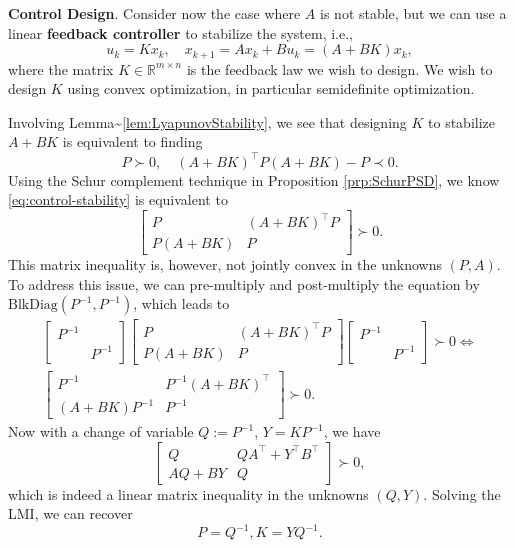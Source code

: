 \documentclass[
]{book}
\theoremstyle{definition}
\theoremstyle{definition}
\theoremstyle{definition}
\theoremstyle{definition}
\theoremstyle{remark}
\begin{document}
\textbf{Control Design}. Consider now the case where \(A\) is not stable, but we can use a linear \textbf{feedback controller} to stabilize the system, i.e.,
\[
u_k = K x_k, \quad x_{k+1} = A x_k + B u_k = (A+ BK) x_k,
\]
where the matrix \(K \in \mathbb{R}^{m \times n}\) is the feedback law we wish to design. We wish to design \(K\) using convex optimization, in particular semidefinite optimization.

Involving Lemma\textasciitilde\ref{lem:LyapunovStability}, we see that designing \(K\) to stabilize \(A + BK\) is equivalent to finding
\begin{equation}
P \succ 0, \quad (A + BK)^\top P (A + BK) - P \prec 0.
\label{eq:control-stability}
\end{equation}
Using the Schur complement technique in Proposition \ref{prp:SchurPSD}, we know \eqref{eq:control-stability} is equivalent to
\[
\begin{bmatrix}
P & (A + BK)^\top P \\
P(A+BK) & P \end{bmatrix} \succ 0.
\]
This matrix inequality is, however, not jointly convex in the unknowns \((P,A)\). To address this issue, we can pre-multiply and post-multiply the equation by \(\mathrm{BlkDiag}(P^{-1}, P^{-1})\), which leads to
\begin{equation}
\begin{split}
\begin{bmatrix} P^{-1}& \\
& P^{-1}\end{bmatrix}
\begin{bmatrix}
P & (A + BK)^\top P \\
P(A+BK) & P \end{bmatrix}
\begin{bmatrix} P^{-1}& \\
& P^{-1}\end{bmatrix} \succ 0  \Leftrightarrow \\
\begin{bmatrix} P^{-1}& P^{-1}(A + BK)^\top\\ (A+BK)P^{-1}& P^{-1}\end{bmatrix} \succ 0.
\end{split}
\end{equation}
Now with a change of variable \(Q:= P^{-1}\), \(Y = K P^{-1}\), we have
\[
\begin{bmatrix} Q & Q A^\top+ Y^\top B^\top\\
A Q + BY & Q \end{bmatrix} \succ 0,
\]
which is indeed a linear matrix inequality in the unknowns \((Q,Y)\). Solving the LMI, we can recover
\[
P = Q^{-1}, K = Y Q^{-1}.
\]
\end{document}

